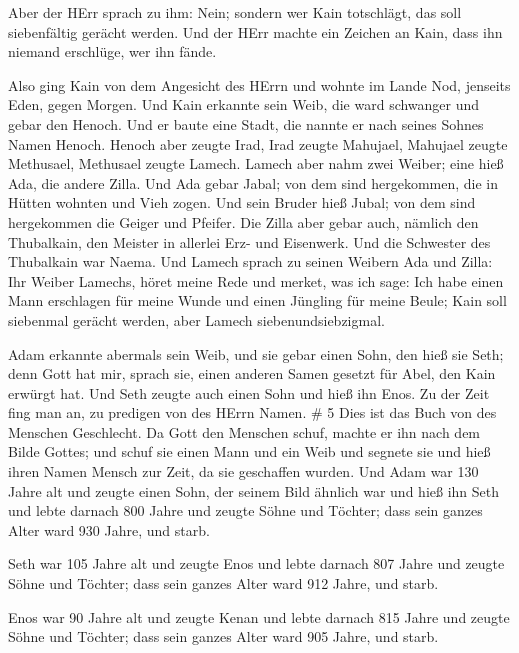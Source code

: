  Aber der HErr sprach zu ihm: Nein; sondern wer Kain
totschlägt, das soll siebenfältig gerächt werden. Und der HErr machte
ein Zeichen an Kain, dass ihn niemand erschlüge, wer ihn fände.

 Also ging Kain von dem Angesicht des HErrn und wohnte im
Lande Nod, jenseits Eden, gegen Morgen.  Und Kain erkannte
sein Weib, die ward schwanger und gebar den Henoch. Und er baute eine
Stadt, die nannte er nach seines Sohnes Namen Henoch. 
Henoch aber zeugte Irad, Irad zeugte Mahujael, Mahujael zeugte
Methusael, Methusael zeugte Lamech.  Lamech aber nahm zwei
Weiber; eine hieß Ada, die andere Zilla.  Und Ada gebar
Jabal; von dem sind hergekommen, die in Hütten wohnten und Vieh zogen.
 Und sein Bruder hieß Jubal; von dem sind hergekommen die
Geiger und Pfeifer.  Die Zilla aber gebar auch, nämlich den
Thubalkain, den Meister in allerlei Erz- und Eisenwerk. Und die
Schwester des Thubalkain war Naema.  Und Lamech sprach zu
seinen Weibern Ada und Zilla: Ihr Weiber Lamechs, höret meine Rede und
merket, was ich sage: Ich habe einen Mann erschlagen für meine Wunde und
einen Jüngling für meine Beule;  Kain soll siebenmal
gerächt werden, aber Lamech siebenundsiebzigmal.

 Adam erkannte abermals sein Weib, und sie gebar einen
Sohn, den hieß sie Seth; denn Gott hat mir, sprach sie, einen anderen
Samen gesetzt für Abel, den Kain erwürgt hat.  Und Seth
zeugte auch einen Sohn und hieß ihn Enos. Zu der Zeit fing man an, zu
predigen von des HErrn Namen. \# 5  Dies ist das Buch von
des Menschen Geschlecht. Da Gott den Menschen schuf, machte er ihn nach
dem Bilde Gottes;  und schuf sie einen Mann und ein Weib und
segnete sie und hieß ihren Namen Mensch zur Zeit, da sie geschaffen
wurden.  Und Adam war 130 Jahre alt und zeugte einen Sohn,
der seinem Bild ähnlich war und hieß ihn Seth  und lebte
darnach 800 Jahre und zeugte Söhne und Töchter;  dass sein
ganzes Alter ward 930 Jahre, und starb.

 Seth war 105 Jahre alt und zeugte Enos  und
lebte darnach 807 Jahre und zeugte Söhne und Töchter;  dass
sein ganzes Alter ward 912 Jahre, und starb.

 Enos war 90 Jahre alt und zeugte Kenan  und
lebte darnach 815 Jahre und zeugte Söhne und Töchter;  dass
sein ganzes Alter ward 905 Jahre, und starb.

